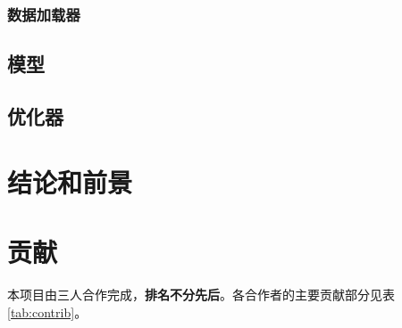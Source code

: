 \documentclass{article}
\begin{document}
\subsubsection{数据加载器}
\subsection{模型}
\subsection{优化器}

\section{结论和前景}


\section{贡献}
本项目由三人合作完成，\textbf{排名不分先后}。各合作者的主要贡献部分见表 \ref{tab:contrib}。
\end{document}
